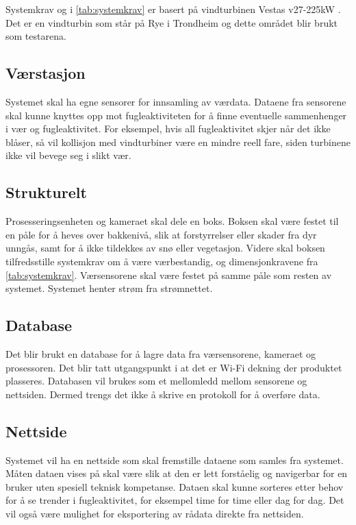 Systemkrav  og  i \autoref{tab:systemkrav} er basert på vindturbinen Vestas v27-225kW \cite{vindturbin}.
Det er en vindturbin som står på Rye i Trondheim og dette området blir brukt som testarena.


\subsection{Værstasjon}\label{sec:design:vaerstasjon}
Systemet skal ha egne sensorer for innsamling av værdata. 
Dataene fra sensorene skal kunne knyttes opp mot fugleaktiviteten for å finne eventuelle sammenhenger i vær og fugleaktivitet. 
For eksempel, hvis all fugleaktivitet skjer når det ikke blåser, så vil kollisjon med vindturbiner være en mindre reell fare, siden turbinene ikke vil bevege seg i slikt vær. 

\subsection{Strukturelt}\label{sec:design:strukturelt}

Prosesseringsenheten og kameraet skal dele en boks. Boksen skal være festet til en påle for å heves over bakkenivå, slik at forstyrrelser eller skader fra dyr unngås, samt for å ikke tildekkes av snø eller vegetasjon. Videre skal boksen tilfredsstille systemkrav  om å være værbestandig, og dimensjonkravene  fra \autoref{tab:systemkrav}. Værsensorene skal være festet på samme påle som resten av systemet. Systemet henter strøm fra strømnettet.

\subsection{Database}\label{sec:design:database}

Det blir brukt en database for å lagre data fra værsensorene, kameraet og prosessoren. Det blir tatt utgangspunkt i at det er Wi-Fi dekning der produktet plasseres. Databasen vil brukes som et mellomledd mellom sensorene og nettsiden. Dermed trengs det ikke å skrive en protokoll for å overføre data. 


\subsection{Nettside}\label{sec:design:nettside}

Systemet vil ha en nettside som skal fremstille dataene som samles fra systemet. 
Måten dataen vises på skal være slik at den er lett forståelig og navigerbar for en bruker uten spesiell teknisk kompetanse. 
Dataen skal kunne sorteres etter behov for å se trender i fugleaktivitet, for eksempel time for time eller dag for dag. 
Det vil også være mulighet for eksportering av rådata direkte fra nettsiden. 

